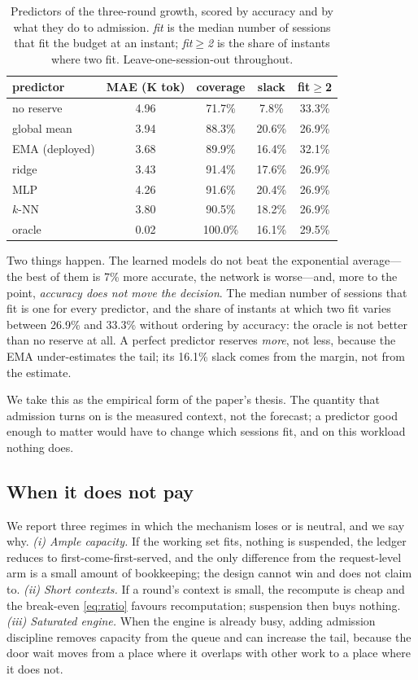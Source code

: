 \begin{table}[t]
\caption{Predictors of the three-round growth, scored by accuracy and by what they do to
admission. \emph{fit} is the median number of sessions that fit the budget at an instant;
\emph{fit$\ge$2} is the share of instants where two fit. Leave-one-session-out throughout.}
\label{tab:predictor}
\centering
\footnotesize
\begin{tabular}{@{}lcccc@{}}
\toprule
predictor & MAE (K tok) & coverage & slack & fit$\ge$2 \\
\midrule
no reserve & 4.96 & 71.7\% & 7.8\% & 33.3\% \\
global mean & 3.94 & 88.3\% & 20.6\% & 26.9\% \\
EMA (deployed) & 3.68 & 89.9\% & 16.4\% & 32.1\% \\
ridge & 3.43 & 91.4\% & 17.6\% & 26.9\% \\
MLP & 4.26 & 91.6\% & 20.4\% & 26.9\% \\
$k$-NN & 3.80 & 90.5\% & 18.2\% & 26.9\% \\
oracle & 0.02 & 100.0\% & 16.1\% & 29.5\% \\
\bottomrule
\end{tabular}
\end{table}

Two things happen. The learned models do not beat the exponential average---the best of
them is 7\% more accurate, the network is worse---and, more to the point, \emph{accuracy
does not move the decision}. The median number of sessions that fit is one for every
predictor, and the share of instants at which two fit varies between 26.9\% and 33.3\%
without ordering by accuracy: the oracle is not better than no reserve at all. A perfect
predictor reserves \emph{more}, not less, because the EMA under-estimates the tail; its
16.1\% slack comes from the margin, not from the estimate.

We take this as the empirical form of the paper's thesis. The quantity that admission
turns on is the measured context, not the forecast; a predictor good enough to matter
would have to change which sessions fit, and on this workload nothing does.

\subsection{When it does not pay}
\label{sec:eval-neg}

We report three regimes in which the mechanism loses or is neutral, and we say why.
\emph{(i) Ample capacity.} If the working set fits, nothing is suspended, the ledger reduces
to first-come-first-served, and the only difference from the request-level arm is a small
amount of bookkeeping; the design cannot win and does not claim to. \emph{(ii) Short
contexts.} If a round's context is small, the recompute is cheap and the break-even
\eqref{eq:ratio} favours recomputation; suspension then buys nothing. \emph{(iii) Saturated
engine.} When the engine is already busy, adding admission discipline removes capacity from
the queue and can increase the tail, because the door wait moves from a place where it
overlaps with other work to a place where it does not.

